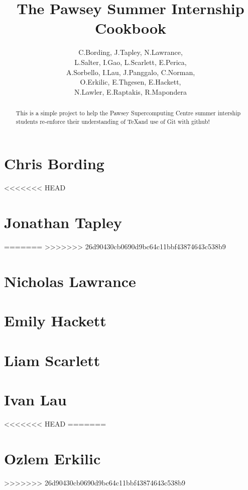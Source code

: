\documentclass[11pt,a4paper]{report}
\title{The Pawsey Summer Internship Cookbook}
\author{C.Bording, J.Tapley, N.Lawrance,\\
L.Salter, I.Gao, L.Scarlett, E.Perica,\\
A.Sorbello, I.Lau, J.Panggalo, C.Norman,\\
O.Erkilic, E.Thgesen, E.Hackett,\\
N.Lawler, E.Raptakis, R.Mapondera}
\begin{document}
\maketitle
\tableofcontents


\begin{abstract}

This is a simple project to help the Pawsey Supercomputing Centre summer intership students re-enforce their understanding of \TeX and use of Git with github!

\end{abstract}

\chapter{Chris Bording}



<<<<<<< HEAD
\chapter{Jonathan Tapley}

=======
>>>>>>> 26d90430cb0690d9bc64c11bbf43874643c538b9

\chapter{Nicholas Lawrance}


\chapter{Emily Hackett}


\chapter{Liam Scarlett}


\chapter{Ivan Lau}


<<<<<<< HEAD
=======
\chapter{Ozlem Erkilic}


>>>>>>> 26d90430cb0690d9bc64c11bbf43874643c538b9
\end{document}
